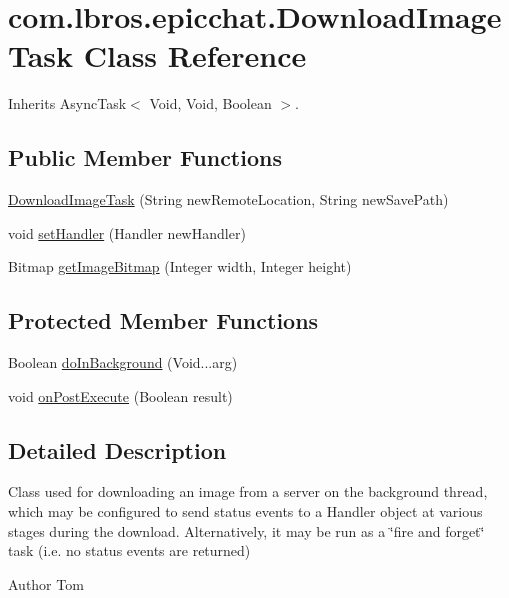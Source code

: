 \hypertarget{classcom_1_1lbros_1_1epicchat_1_1_download_image_task}{\section{com.\-lbros.\-epicchat.\-Download\-Image\-Task Class Reference}
\label{classcom_1_1lbros_1_1epicchat_1_1_download_image_task}
}


Inherits Async\-Task$<$ Void, Void, Boolean $>$.

\subsection*{Public Member Functions}
\begin{DoxyCompactItemize}
\item 
\hyperlink{classcom_1_1lbros_1_1epicchat_1_1_download_image_task_a6f27a70f86456db67b2a2c7c5b9a23f4}{Download\-Image\-Task} (String new\-Remote\-Location, String new\-Save\-Path)
\item 
void \hyperlink{classcom_1_1lbros_1_1epicchat_1_1_download_image_task_a489dffc633e5da58819087783287770b}{set\-Handler} (Handler new\-Handler)
\item 
Bitmap \hyperlink{classcom_1_1lbros_1_1epicchat_1_1_download_image_task_aed610c9cc2e02bb3fc486ef516a04a15}{get\-Image\-Bitmap} (Integer width, Integer height)
\end{DoxyCompactItemize}
\subsection*{Protected Member Functions}
\begin{DoxyCompactItemize}
\item 
Boolean \hyperlink{classcom_1_1lbros_1_1epicchat_1_1_download_image_task_a3670858e9c12671d0d5fe7baad3a59eb}{do\-In\-Background} (Void...\-arg)
\item 
void \hyperlink{classcom_1_1lbros_1_1epicchat_1_1_download_image_task_a9c3ad8d7a90252084e8fe038a20831fb}{on\-Post\-Execute} (Boolean result)
\end{DoxyCompactItemize}


\subsection{Detailed Description}
Class used for downloading an image from a server on the background thread, which may be configured to send status events to a Handler object at various stages during the download. Alternatively, it may be run as a \char`\"{}fire and forget\char`\"{} task (i.\-e. no status events are returned) \begin{DoxyAuthor}{Author}
Tom 
\end{DoxyAuthor}


